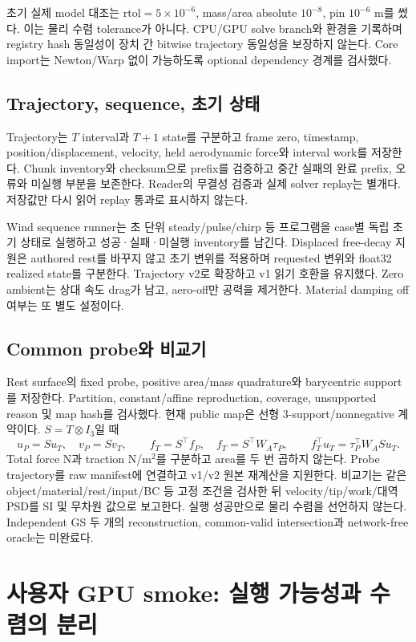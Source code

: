 \documentclass[10pt]{article}
\begin{document}
초기 실제 model 대조는 \(\mathrm{rtol}=5\times10^{-6}\), mass/area absolute \(10^{-8}\),
pin \(10^{-6}\) m를 썼다. 이는 물리 수렴 tolerance가 아니다.
CPU/GPU solve branch와 환경을 기록하며 registry hash 동일성이 장치 간 bitwise trajectory 동일성을
보장하지 않는다. Core import는 Newton/Warp 없이 가능하도록 optional dependency 경계를 검사했다.

\subsection{Trajectory, sequence, 초기 상태}

Trajectory는 \(T\) interval과 \(T+1\) state를 구분하고 frame zero, timestamp, position/displacement,
velocity, held aerodynamic force와 interval work를 저장한다. Chunk inventory와 checksum으로 prefix를
검증하고 중간 실패의 완료 prefix, 오류와 미실행 부분을 보존한다. Reader의 무결성 검증과 실제 solver
replay는 별개다. 저장값만 다시 읽어 replay 통과로 표시하지 않는다.

Wind sequence runner는 초 단위 steady/pulse/chirp 등 프로그램을 case별 독립 초기 상태로 실행하고
성공·실패·미실행 inventory를 남긴다. Displaced free-decay 지원은 authored rest를 바꾸지 않고
초기 변위를 적용하며 requested 변위와 float32 realized state를 구분한다. Trajectory v2로 확장하고
v1 읽기 호환을 유지했다. Zero ambient는 상대 속도 drag가 남고, aero-off만 공력을 제거한다.
Material damping off 여부는 또 별도 설정이다.

\subsection{Common probe와 비교기}

Rest surface의 fixed probe, positive area/mass quadrature와 barycentric support를 저장한다.
Partition, constant/affine reproduction, coverage, unsupported reason 및 map hash를 검사했다.
현재 public map은 선형 3-support/nonnegative 계약이다. \(S=T\otimes I_3\)일 때
\[
 u_P=Su_T,\quad v_P=Sv_T,\qquad
 f_T=S^\top f_P,\quad f_T=S^\top W_A\tau_P,
 \qquad f_T^\top u_T=\tau_P^\top W_ASu_T.
\]
Total force N과 traction N/m\(^2\)를 구분하고 area를 두 번 곱하지 않는다.
Probe trajectory를 raw manifest에 연결하고 v1/v2 원본 재계산을 지원한다.
비교기는 같은 object/material/rest/input/BC 등 고정 조건을 검사한 뒤 velocity/tip/work/대역 PSD를
SI 및 무차원 값으로 보고한다. 실행 성공만으로 물리 수렴을 선언하지 않는다.
Independent GS 두 개의 reconstruction, common-valid intersection과 network-free oracle는 미완료다.

\section{사용자 GPU smoke: 실행 가능성과 수렴의 분리}
\end{document}
